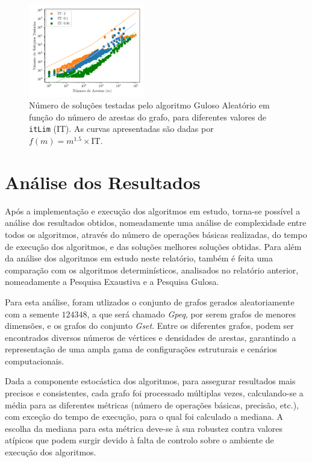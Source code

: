 \documentclass[mirror, portugues]{revdetua}
\begin{document}
\begin{figure}[H]
    \centering
    \includegraphics[width=0.45\textwidth]{../assets/sols_Random Greedy.png}
    \caption{Número de soluções testadas pelo algoritmo Guloso Aleatório em função do número de arestas do grafo, para diferentes valores de \texttt{itLim} (IT). As curvas apresentadas são dadas por $f(m) = m^{1.5} \times \text{IT}$.}
    \label{fig:sols_randomgreedy}
\end{figure}

\section{Análise dos Resultados}

Após a implementação e execução dos algoritmos em estudo, torna-se possível a análise dos resultados obtidos, nomeadamente uma análise de complexidade entre todos os algoritmos, através do número de operações básicas realizadas, do tempo de execução dos algoritmos, e das soluções melhores soluções obtidas. Para além da análise dos algoritmos em estudo neste relatório, também é feita uma comparação com os algoritmos determinísticos, analisados no relatório anterior, nomeadamente a Pesquisa Exaustiva e a Pesquisa Gulosa.

Para esta análise, foram utlizados o conjunto de grafos gerados aleatoriamente com a semente $124348$, a que será chamado \textit{Gpeq}, por serem grafos de menores dimensões, e os grafos do conjunto \textit{Gset}. Entre os diferentes grafos, podem ser encontrados diversos números de vértices e densidades de arestas, garantindo a representação de uma ampla gama de configurações estruturais e cenários computacionais.

Dada a componente estocástica dos algoritmos, para assegurar resultados mais precisos e consistentes, cada grafo foi processado múltiplas vezes, calculando-se a média para as diferentes métricas (número de operações básicas, precisão, etc.), com exceção do tempo de execução, para o qual foi calculado a mediana. A escolha da mediana para esta métrica deve-se à sua robustez contra valores atípicos que podem surgir devido à falta de controlo sobre o ambiente de execução dos algoritmos.
\end{document}
